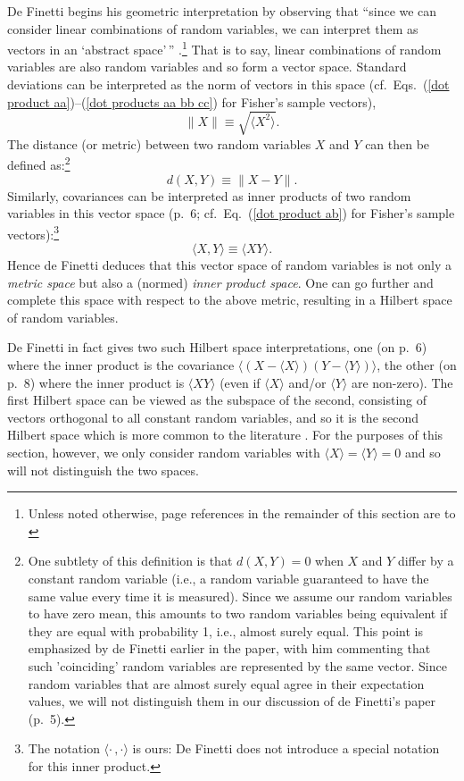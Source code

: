De Finetti begins his geometric interpretation by observing that ``since we can consider linear combinations of random variables, we can interpret them as vectors in an `abstract space'\,'' \citep[p.\ 5]{De Finetti 1937}.\footnote{Unless noted otherwise, page references in the remainder of this section are to \citet{De Finetti 1937} } That is to say, linear combinations of random variables are also random variables and so form a vector space. Standard deviations can be interpreted as the norm of vectors in this space (cf.\ Eqs.\ (\ref{dot product aa})--(\ref{dot products aa bb cc}) for Fisher's sample vectors), 
\begin{equation}
\| X\| \equiv \sqrt{\langle X^2 \rangle}.
\end{equation}
The distance (or metric) between two random variables $X$ and $Y$ can then be defined as:\footnote{One subtlety of this definition is that $d(X,Y)=0$ when $X$ and $Y$ differ by a constant random variable (i.e., a random variable guaranteed to have the same value every time it is measured). Since we assume our random variables to have zero mean, this amounts to two random variables being equivalent if they are equal with probability 1, i.e., almost surely equal. This point is emphasized by de Finetti earlier in the paper, with him commenting that such 'coinciding' random variables are represented by the same vector. Since  random variables that are almost surely equal agree in their expectation values, we will not distinguish them in our discussion of de Finetti's paper (p.\ 5).}
\begin{equation}
d(X,Y) \equiv \|X-Y\|.
\end{equation}
Similarly, covariances can be interpreted as inner products of two random variables in this vector space (p.\ 6; cf.\ Eq.\ (\ref{dot product ab}) for Fisher's sample vectors):\footnote{The notation $\langle \cdot \,, \cdot \rangle$ is ours: De Finetti does not introduce a special notation for this inner product.}
\begin{equation}
 \langle X,Y\rangle \equiv \langle X Y\rangle. 
\end{equation}
Hence de Finetti deduces that this vector space of random variables is not only a \emph{metric space} but also a (normed) \emph{inner product space}. One can go further and complete this space with respect to the above metric, resulting in a Hilbert space of random variables. 

De Finetti in fact gives two such Hilbert space interpretations, one (on p.\ 6) where the inner product is the covariance $\langle (X-\langle X\rangle) (Y-\langle Y\rangle)\rangle$, the other (on p.\ 8) where the inner product is $\langle X Y\rangle$ (even if $\langle X \rangle$ and/or $\langle Y \rangle$ are non-zero). The first Hilbert space can be viewed as the subspace of the second, consisting of vectors orthogonal to all constant random variables, and so it is the second Hilbert space which is more common to the literature \citep[see again][]{Fristedt and Gray 1997}.  For the purposes of this section, however, we only consider random variables with $\langle X \rangle = \langle Y \rangle = 0$ and so will not distinguish the two spaces.


